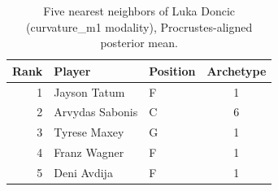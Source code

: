 \begin{table}[htbp]
  \centering\small
  \begin{tabular}{rllc}
    \toprule
    Rank & Player & Position & Archetype \\
    \midrule
    1 & Jayson Tatum & F & 1 \\
    2 & Arvydas Sabonis & C & 6 \\
    3 & Tyrese Maxey & G & 1 \\
    4 & Franz Wagner & F & 1 \\
    5 & Deni Avdija & F & 1 \\
    \bottomrule
  \end{tabular}
  \caption{Five nearest neighbors of Luka Doncic (curvature_m1 modality), Procrustes-aligned posterior mean.}
  \label{tab:Luka_Doncic_neighbors_curvature_m1}
\end{table}

